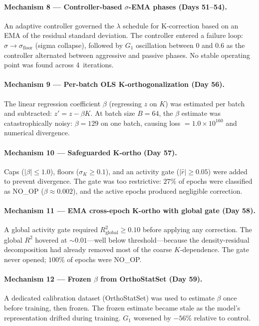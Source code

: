 \paragraph{Mechanism 8 --- Controller-based $\sigma$-EMA phases (Days 51--54).} An adaptive controller governed the $\lambda$ schedule for K-correction based on an EMA of the residual standard deviation. The controller entered a failure loop: $\sigma \to \sigma_{\mathrm{floor}}$ (sigma collapse), followed by $G_1$ oscillation between $0$ and $0.6$ as the controller alternated between aggressive and passive phases. No stable operating point was found across 4~iterations.

\paragraph{Mechanism 9 --- Per-batch OLS K-orthogonalization (Day 56).} The linear regression coefficient $\beta$ (regressing $z$ on $K$) was estimated per batch and subtracted: $z' = z - \beta K$. At batch size $B{=}64$, the $\beta$ estimate was catastrophically noisy: $\beta = 129$ on one batch, causing loss $= 1.0 \times 10^{160}$ and numerical divergence.

\paragraph{Mechanism 10 --- Safeguarded K-ortho (Day 57).} Caps ($|\beta| \leq 1.0$), floors ($\sigma_K \geq 0.1$), and an activity gate ($|\hat{r}| \geq 0.05$) were added to prevent divergence. The gate was too restrictive: $27\%$ of epochs were classified as NO\_OP ($\beta \approx 0.002$), and the active epochs produced negligible correction.

\paragraph{Mechanism 11 --- EMA cross-epoch K-ortho with global gate (Day 58).} A global activity gate required $R^2_{\mathrm{global}} \geq 0.10$ before applying any correction. The global $R^2$ hovered at ${\sim}0.01$---well below threshold---because the density-residual decomposition had already removed most of the coarse $K$-dependence. The gate never opened; $100\%$ of epochs were NO\_OP.

\paragraph{Mechanism 12 --- Frozen $\beta$ from OrthoStatSet (Day 59).} A dedicated calibration dataset (OrthoStatSet) was used to estimate $\beta$ once before training, then frozen. The frozen estimate became stale as the model's representation drifted during training. $G_1$ worsened by $-56\%$ relative to control.

